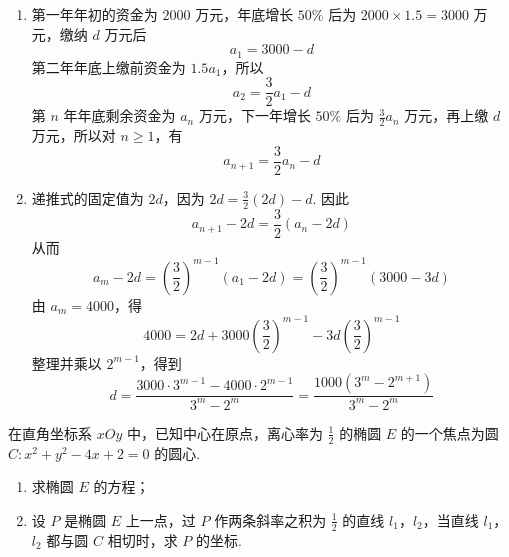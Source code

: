 \begin{solution}
\begin{enumerate}
\item 第一年年初的资金为 \(2000\) 万元，年底增长 \(50\%\) 后为
\(2000\times1.5=3000\) 万元，缴纳 \(d\) 万元后
\[
a_1=3000-d
\]
第二年年底上缴前资金为 \(1.5a_1\)，所以
\[
a_2=\frac32a_1-d
\]
第 \(n\) 年年底剩余资金为 \(a_n\) 万元，下一年增长 \(50\%\) 后为 \(\frac32a_n\) 万元，再上缴 \(d\) 万元，所以对 \(n\geqslant1\)，有
\[
a_{n+1}=\frac32a_n-d
\]
\item 递推式的固定值为 \(2d\)，因为
\(2d=\frac32(2d)-d\). 因此
\[
a_{n+1}-2d=\frac32(a_n-2d)
\]
从而
\[
a_m-2d=\left(\frac32\right)^{m-1}(a_1-2d)
=\left(\frac32\right)^{m-1}(3000-3d)
\]
由 \(a_m=4000\)，得
\[
4000=2d+3000\left(\frac32\right)^{m-1}
-3d\left(\frac32\right)^{m-1}
\]
整理并乘以 \(2^{m-1}\)，得到
\[
d=\frac{3000\cdot3^{m-1}-4000\cdot2^{m-1}}{3^m-2^m}
=\frac{1000\left(3^m-2^{m+1}\right)}{3^m-2^m}
\]
\end{enumerate}
\end{solution}

\begin{problem}
在直角坐标系 \(xOy\) 中，已知中心在原点，离心率为 \(\frac{1}{2}\) 的椭圆 \(E\) 的一个焦点为圆 \(C: x^2 + y^2 - 4x + 2 = 0\) 的圆心.
\begin{enumerate}
\item 求椭圆 \(E\) 的方程；
\item 设 \(P\) 是椭圆 \(E\) 上一点，过 \(P\) 作两条斜率之积为 \(\frac{1}{2}\) 的直线 \(l_{1}\)，\(l_{2}\)，当直线 \(l_{1}\)，\(l_{2}\) 都与圆 \(C\) 相切时，求 \(P\) 的坐标.
\end{enumerate}

\end{problem}

